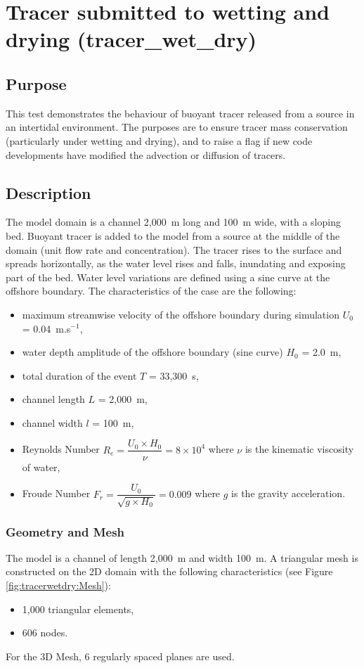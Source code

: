 \chapter{Tracer submitted to wetting and drying (tracer\_wet\_dry)}

\section{Purpose}

This test demonstrates the behaviour of buoyant tracer released from a source in an intertidal environment.
The purposes are to ensure tracer mass conservation (particularly under wetting and drying),
and to raise a flag if new code developments have modified the advection or diffusion of tracers.

\section{Description}

The model domain is a channel 2,000~m long and 100~m wide, with a sloping bed.
Buoyant tracer is added to the model from a source at the middle of the domain (unit flow rate and concentration). The tracer rises to the surface and spreads horizontally, as the water level rises and falls, inundating and exposing part of the bed. Water level variations are defined using a sine curve at the offshore boundary. The characteristics of the case are the following:
\begin{itemize}
  \itemsep0em
\item maximum streamwise velocity of the offshore boundary during simulation $U_0$ = 0.04~m.s$^{-1}$,
\item water depth amplitude of the offshore boundary (sine curve) $H_0$ = 2.0~m,
\item total duration of the event $T$ = 33,300~s,
\item channel length $L$ = 2,000~m,
\item channel width $l$ = 100~m,
\item Reynolds Number \textbf{$R_e = \dfrac{U_0 \times H_0}{\nu} =  8 \times 10^4$} where $\nu$ is the kinematic viscosity of water,
\item Froude Number \textbf{$F_r = \dfrac{U_0}{\sqrt{g \times H_0}} = 0.009$} where $g$ is the gravity acceleration.
\end{itemize}

\subsection{Geometry and Mesh}
The model is a channel of length 2,000~m and width 100~m.
A triangular mesh is constructed on the 2D domain with the following
characteristics (see Figure \ref{fig:tracerwetdry:Mesh}):
\begin{itemize}
\itemsep0em
\item 1,000 triangular elements,
\item 606 nodes.
\end{itemize}
For the 3D Mesh, 6 regularly spaced planes are used.

